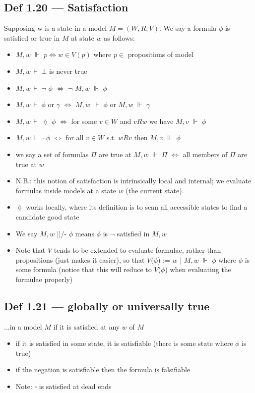 \documentclass[10pt, a4paper, twoside]{article}
\begin{document}
\subsection{Def 1.20 --- Satisfaction}
Supposing w is a state in a model $M = (W, R, V)$. We say a formula $\phi$ is satisfied or true in $M$ at state $w$ as follows:
\begin{itemize}
  \item $M, w$ $\Vdash$ $p \iff w \in V(p)$ where $p \in$ propositions of model
  \item $M, w \Vdash$ $\bot$ is never true
  \item $M, w \Vdash$ $\neg$ $\phi$ $\iff$ $\neg$ $M, w$ $\Vdash$ $\phi$
  \item $M, w \Vdash$ $\phi$ or $\gamma$ $\iff$ $M, w$ $\Vdash$ $\phi$ or $M, w$ $\Vdash$ $\gamma$
  \item $M, w \Vdash$ $\lozenge$ $\phi$ $\iff$ for some $v \in W$ and $vRw$ we have $M, v$ $\Vdash$ $\phi$
  \item $M, w \Vdash$ $\square$ $\phi$ $\iff$ for all $v \in W$ s.t. $wRv$ then $M, v$ $\Vdash$ $\phi$
  \item we say a set of formulas $\Pi$ are true at $M, w$ $\Vdash$ $\Pi$ $\iff$ all members of $\Pi$ are true at $w$
  \item N.B.: this notion of satisfaction is intrinsically local and internal; we evaluate formulas inside models at a state $w$ (the current state).
\end{itemize}
\begin{itemize}
  \item $\lozenge$ works locally, where its definition is to scan all accessible states to find a candidate good state
  \item We say $M, w$ ||/- $\phi$ means $\phi$ is $\neg$ satisfied in $M, w$
  \item Note that $V$ tends to be extended to evaluate formulae, rather than propositions (just makes it easier), so that $V$($\phi$) := {$w$ | $M, w$ $\Vdash$ $\phi$} where $\phi$ is some formula (notice that this will reduce to $V$($\phi$) when evaluating the formulae properly)
\end{itemize}

\subsection{Def 1.21 --- globally or universally true}
...in a model $M$ if it is satisfied at any $w$ of $M$
\begin{itemize}
  \item if it is satisfied in some state, it is satisfiable (there is some state where $\phi$ is true)
  \item if the negation is satisfiable then the formula is falsifiable
  \item Note: $\square$ is satisfied at dead ends
\end{itemize}
\end{document}
